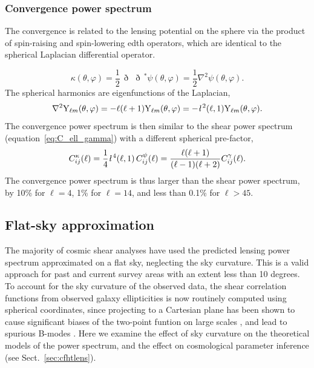 \documentclass[fleqn,usenatbib]{mnras} %
\newcommand{\ellbar}{\hbox{\it \l}\,}
\newcommand{\edth}{\,\eth\,}
\begin{document}
\subsubsection{Convergence power spectrum}

The convergence is related to the lensing potential on the sphere via the
product of spin-raising and spin-lowering edth operators, which are identical
to the spherical Laplacian differential operator.

%
\begin{equation}
  \kappa(\theta, \varphi) = \frac 1 2 \edth \edth^\ast \psi(\theta, \varphi) = \frac 1 2 \nabla^2 \psi(\theta, \varphi).
  \label{eq:kappa_psi_spher}
\end{equation}
%
The spherical harmonics are eigenfunctions of the Laplacian,
%
\begin{equation}
  \nabla^2 {\rm Y}_{\ell m}(\theta, \varphi) = - \ell (\ell + 1) {\rm Y}_{\ell m}(\theta, \varphi)
    = - \ellbar^2(\ell, 1) {\rm Y}_{\ell m}(\theta, \varphi).
  \label{eq:nabla_Ylm}
\end{equation}
%
The convergence power spectrum is then similar to the shear power spectrum
(equation~\ref{eq:C_ell_gamma}) with a different spherical pre-factor,
\citep{2000PhRvD..62d3007H,jk12}
%
\begin{equation}
  C^\kappa_{ij}(\ell) = \frac 1 4 \ellbar^4(\ell, 1) \, C^\psi_{ij}(\ell)
    = \frac{\ell (\ell+1)}{(\ell-1)(\ell+2)} C^\gamma_{ij}(\ell) .
  \label{eq:C_ell_kappa_full}
\end{equation}
%
The convergence power spectrum is thus larger than the shear power spectrum, by
10\% for $\ell=4$, 1\% for $\ell = 14$, and less than 0.1\% for $\ell>45$.


\subsection{Flat-sky approximation}

The majority of cosmic shear analyses have used the predicted lensing power
spectrum approximated on a flat sky, neglecting the sky curvature. This is a
valid approach for past and current survey areas with an extent less than 10
degrees. To account for the sky curvature of the observed data, the shear
correlation functions from observed galaxy ellipticities is now routinely
computed using spherical coordinates, since projecting to a Cartesian plane has
been shown to cause significant biases of the two-point funtion on large scales
\citep{FSHK08}, and lead to spurious B-modes \citep{asgari/etal:2017}. Here
we examine the effect of sky curvature on the theoretical models of the power
spectrum, and the effect on cosmological parameter inference (see
Sect.~\ref{sec:cfhtlens}).
\end{document}
